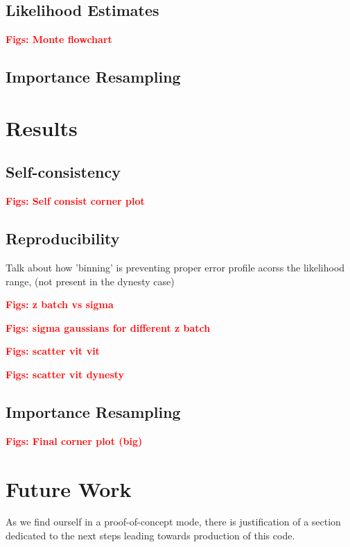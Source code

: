 \documentclass[aps,superscriptaddress,twocolumn,nopreprintnumbers,floatfix,groupedaddress]{revtex4-1}
\newcommand{\dynesty}{{\sc dynesty}\xspace}
\begin{document}
\subsection{Likelihood Estimates}

\textbf{\textcolor{red}{Figs: Monte flowchart}}

\subsection{Importance Resampling}


\section{Results}\label{results}

\subsection{Self-consistency}

\textbf{\textcolor{red}{Figs: Self consist corner plot}}

\subsection{Reproducibility}

Talk about how 'binning' is preventing proper error profile acorss the likelihood range, (not present in the \dynesty case)

\textbf{\textcolor{red}{Figs: z batch vs sigma}}

\textbf{\textcolor{red}{Figs: sigma gaussians for different z batch}}

\textbf{\textcolor{red}{Figs: scatter vit vit}}

\textbf{\textcolor{red}{Figs: scatter vit dynesty}}

\subsection{Importance Resampling}


\textbf{\textcolor{red}{Figs: Final corner plot (big)}}


\section{Future Work}\label{future}

As we find ourself in a proof-of-concept mode, there is justification of a section dedicated to the next steps leading towards production of this code.
\end{document}
